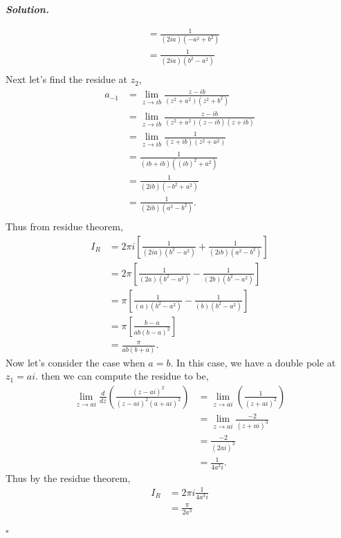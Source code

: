 \documentclass[12pt]{report}
\newenvironment{solution}[1][\it{Solution}]{\textbf{#1. } }{$\square$}
\begin{document}
\begin{solution}
\begin{enumerate}
\begin{align*}
            &= \frac{1}{(2ia)(-a^2 + b^2)}\\
            &= \frac{1}{(2ia)(b^2-a^2)}\\
        \end{align*}
        Next let's find the residue at $z_2$,
        \begin{align*}
            a_{-1} &= \lim_{z \rightarrow ib} \frac{z-ib}{(z^2 + a^2)(z^2 + b^2)}\\
            &= \lim_{z \rightarrow ib} \frac{z-ib}{(z^2 + a^2)(z - ib)(z + ib)}\\
            &= \lim_{z \rightarrow ib} \frac{1}{(z+ib)(z^2 + a^2)}\\
            &= \frac{1}{(ib+ib)((ib)^2 + a^2)}\\
            &= \frac{1}{(2ib)(-b^2 + a^2)}\\
            &= \frac{1}{(2ib)(a^2-b^2)}.\\
        \end{align*}
        Thus from residue theorem,
        \begin{align*}
            I_R &= 2\pi i \left[ \frac{1}{(2ia)(b^2-a^2)} +  \frac{1}{(2ib)(a^2-b^2)}\right]\\
            &= 2\pi \left[ \frac{1}{(2a)(b^2-a^2)} -  \frac{1}{(2b)(b^2 - a^2)}\right]\\
            &= \pi \left[ \frac{1}{(a)(b^2-a^2)} -  \frac{1}{(b)(b^2 - a^2)}\right]\\
            &= \pi \left[ \frac{b - a}{ab(b-a)^2}\right]\\
            &= \frac{\pi}{ab(b+a)}.
        \end{align*}
        Now let's consider the case when $a=b$. In this case, we have a double pole at $z_1 = ai$. then we can compute the residue to be,
        \begin{align*}
            \lim_{z \rightarrow ai} \frac{d}{dz}\left( \frac{(z-ai)^2}{(z-ai)^2(a+ai)^2}\right) &= \lim_{z \rightarrow ai} \left( \frac{1}{(z + ai)^2}\right)\\
            &= \lim_{z \rightarrow ai} \frac{-2}{(z + ai)^3}\\
            &= \frac{-2}{(2ai)^3}\\
            &= \frac{1}{4a^3i}.
        \end{align*}
        Thus by the residue theorem,
        \begin{align*}
            I_R &= 2\pi i \frac{1}{4a^3i}\\
            &= \frac{\pi}{2a^3}\\

\end{align*}
\end{enumerate}
\end{solution}
\end{document}
